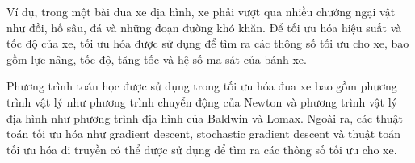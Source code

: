 Ví dụ, trong một bài đua xe địa hình, xe phải vượt qua nhiều chướng ngại vật như đồi, hố sâu, đá và những đoạn đường khó khăn. Để tối ưu hóa hiệu suất và tốc độ của xe, tối ưu hóa được sử dụng để tìm ra các thông số tối ưu cho xe, bao gồm lực nâng, tốc độ, tăng tốc và hệ số ma sát của bánh xe.

Phương trình toán học được sử dụng trong tối ưu hóa đua xe bao gồm phương trình vật lý như phương trình chuyển động của Newton và phương trình vật lý địa hình như phương trình địa hình của Baldwin và Lomax. Ngoài ra, các thuật toán tối ưu hóa như gradient descent, stochastic gradient descent và thuật toán tối ưu hóa di truyền
 có thể được sử dụng để tìm ra các thông số tối ưu cho xe.

